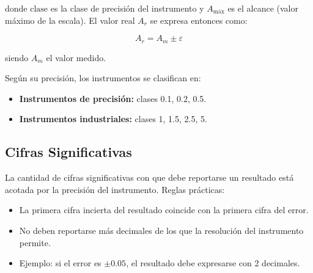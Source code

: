 donde $\text{clase}$ es la clase de precisión del instrumento y $A_{\text{máx}}$ es el alcance (valor máximo de la escala). El valor real $A_r$ se expresa entonces como:

\begin{equation}
    A_r = A_m \pm \varepsilon
\end{equation}

siendo $A_m$ el valor medido.

Según su precisión, los instrumentos se clasifican en:
\begin{itemize}
    \item \textbf{Instrumentos de precisión:} clases 0.1, 0.2, 0.5.
    \item \textbf{Instrumentos industriales:} clases 1, 1.5, 2.5, 5.
\end{itemize}

\subsection{Cifras Significativas}

La cantidad de cifras significativas con que debe reportarse un resultado está acotada por la precisión del instrumento. Reglas prácticas:

\begin{itemize}
    \item La primera cifra incierta del resultado coincide con la primera cifra del error.
    \item No deben reportarse más decimales de los que la resolución del instrumento permite.
    \item Ejemplo: si el error es $\pm 0.05$, el resultado debe expresarse con 2 decimales.
\end{itemize}
